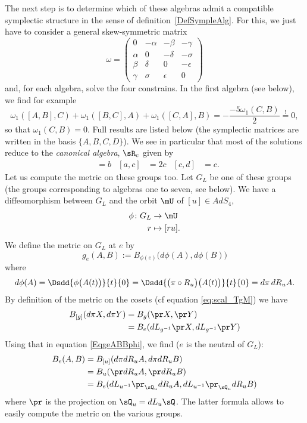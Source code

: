  The next step is to determine which of these algebras admit a compatible symplectic structure in the sense of definition~\ref{DefSympleAlg}.
 For this, we just have to consider a general skew-symmetric matrix
\[
  \omega=
\begin{pmatrix}
0&-\alpha&-\beta&-\gamma\\
\alpha&0&-\delta&-\sigma\\
\beta&\delta&0&-\epsilon\\
\gamma&\sigma&\epsilon&0
\end{pmatrix}
\]
 and, for each algebra, solve the four constrains. In the first algebra (see below), we find for example
\[
  \omega_{1}([A,B],C)+\omega_{1}([B,C],A)+\omega_{1}([C,A],B)=-\frac{ -5\omega_{1}(C,B) }{ 2 }\stackrel{!}{=}0,
\]
so that $\omega_{1}(C,B)=0$. Full results are listed below (the symplectic matrices are written in the basis $\{ A,B,C,D \}$).  We see in particular that most of the solutions reduce to the \emph{canonical algebra}, $\sR_c$ given by
\begin{align*}
[a,b]&=b
&[a,c]&=2c
&[c,d]&=c.
\end{align*}
Let us compute the metric on these groups too. Let $G_{L}$ be one of these groups (the groups corresponding to algebras one to seven, see below). We have a diffeomorphism between $G_{L}$ and the orbit $\mU$ of $[u]\in AdS_4$,
\begin{equation}
\begin{aligned}
 \phi\colon G_{L}&\to \mU \\
r&\mapsto [ru].
\end{aligned}
\end{equation}
We define the metric on $G_{L}$ at $e$ by
\begin{equation}   \label{EqgeABBphi}
  g_{e}(A,B):=B_{\phi(e)}\big( d\phi(A),d\phi(B) \big)
\end{equation}
where
\[
  d\phi(A)=\Dsdd{ \phi\big( A(t) \big) }{t}{0}=\Dsdd{ \big( \pi\circ R_{u} \big)\big( A(t) \big) }{t}{0}=d\pi\,dR_{u}A.
\]
By definition of the metric on the cosets (cf equation \eqref{eq:scal_TgM}) we have
\begin{align*}
B_{[g]}(d\pi X,d\pi Y)&=B_{g}(\pr X,\pr Y)\\
        &=B_{e}(dL_{g^{-1}}\pr X,dL_{g^{-1}}\pr Y)
\end{align*}
Using that in equation \eqref{EqgeABBphi}, we find ($e$ is the neutral of $G_{L}$):
 \[
\begin{split}
  B_{e}(A,B)&=B_{[u]}(d\pi dR_{u}A,d\pi dR_{u}B)\\
        &=B_{u}(\pr dR_{u}A,\pr dR_{u}B)\\
        &=B_{e}(dL_{u^{-1}}\pr_{\sQ_{u}}dR_{u}A,dL_{u^{-1}}\pr_{\sQ_{u}}dR_{u}B)
\end{split}
\]
where $\pr$ is the projection on $\sQ_{u}=dL_{u}\sQ$. The latter formula allows to easily compute the metric on the various groups.

